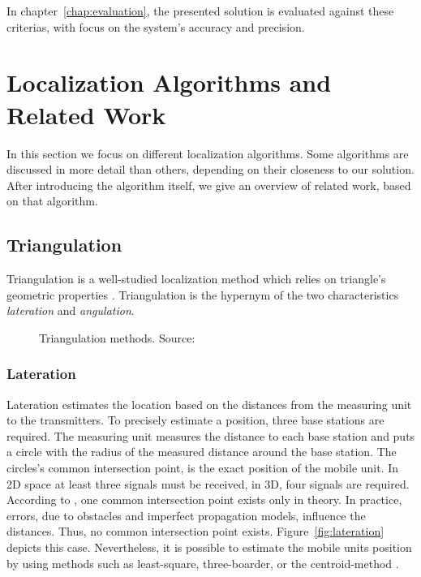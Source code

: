 \noindent In chapter~\ref{chap:evaluation}, the presented solution is evaluated against these criterias, with focus on the system's accuracy and precision.

\section{Localization Algorithms and Related Work}
In this section we focus on different localization algorithms. Some algorithms are discussed in more detail than others, depending on their closeness to our solution. After introducing the algorithm itself, we give an overview of related work, based on that algorithm. 

\subsection{Triangulation}\label{sec:fund_trilateration}
Triangulation is a well-studied localization method which relies on triangle's geometric properties \citep{IEEE:survey_wireless_indoor_pos, wang:bt_pos}. Triangulation is the hypernym of the two characteristics \emph{lateration} and \emph{angulation}.

\begin{figure}[width=0.9\textwidth, height=0.4\textheight]
	
	\caption {Triangulation methods. Source:~\citep{wang:bt_pos}}
	\label{fig:triangulation}
\end{figure}

\subsubsection*{Lateration}
Lateration estimates the location based on the distances from the measuring unit to the transmitters. To precisely estimate a position, three base stations are required. The measuring unit measures the distance to each base station and puts a circle with the radius of the measured distance around the base station. The circles's common intersection point, is the exact position of the mobile unit. In 2D space at least three signals must be received, in 3D, four signals are required. According to \citet{wang:bt_pos}, one common intersection point exists only in theory. In practice, errors, due to obstacles and imperfect propagation models, influence the distances. Thus, no common intersection point exists. Figure~\ref{fig:lateration} depicts this case. Nevertheless, it is possible to estimate the mobile units position by using methods such as least-square, three-boarder, or the centroid-method \citep{wang:bt_pos, IEEE:survey_wireless_indoor_pos}.  


